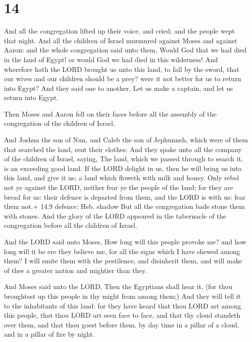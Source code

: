 \hypertarget{section-13}{%
\section{14}\label{section-13}}

 And all the congregation lifted up their voice, and cried;
and the people wept that night.  And all the children of
Israel murmured against Moses and against Aaron: and the whole
congregation said unto them, Would God that we had died in the land of
Egypt! or would God we had died in this wilderness!  And
wherefore hath the LORD brought us unto this land, to fall by the sword,
that our wives and our children should be a prey? were it not better for
us to return into Egypt?  And they said one to another, Let
us make a captain, and let us return into Egypt.

 Then Moses and Aaron fell on their faces before all the
assembly of the congregation of the children of Israel.

 And Joshua the son of Nun, and Caleb the son of
Jephunneh, which were of them that searched the land, rent their
clothes:  And they spake unto all the company of the
children of Israel, saying, The land, which we passed through to search
it, is an exceeding good land.  If the LORD delight in us,
then he will bring us into this land, and give it us; a land which
floweth with milk and honey.  Only rebel not ye against the
LORD, neither fear ye the people of the land; for they are bread for us:
their defence is departed from them, and the LORD is with us: fear them
not.+ 14.9 defence: Heb. shadow  But all the congregation
bade stone them with stones. And the glory of the LORD appeared in the
tabernacle of the congregation before all the children of Israel.

 And the LORD said unto Moses, How long will this people
provoke me? and how long will it be ere they believe me, for all the
signs which I have shewed among them?  I will smite them
with the pestilence, and disinherit them, and will make of thee a
greater nation and mightier than they.

 And Moses said unto the LORD, Then the Egyptians shall
hear it, (for thou broughtest up this people in thy might from among
them;)  And they will tell it to the inhabitants of this
land: for they have heard that thou LORD art among this people, that
thou LORD art seen face to face, and that thy cloud standeth over them,
and that thou goest before them, by day time in a pillar of a cloud, and
in a pillar of fire by night.

